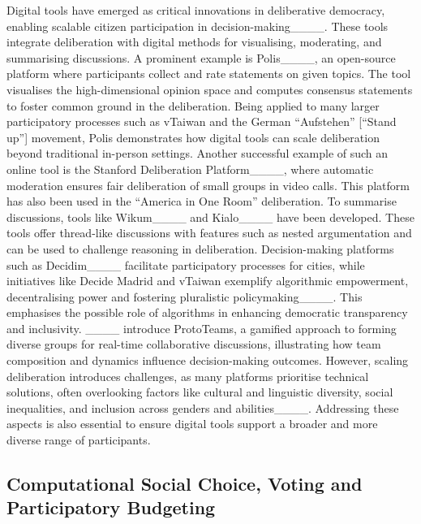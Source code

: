 Digital tools have emerged as critical innovations in deliberative democracy, enabling scalable citizen participation in decision-making____. These tools integrate deliberation with digital methods for visualising, moderating, and summarising discussions. A prominent example is Polis____, an open-source platform where participants collect and rate statements on given topics. The tool visualises the high-dimensional opinion space and computes consensus statements to foster common ground in the deliberation. Being applied to many larger participatory processes such as vTaiwan and the German \enquote{Aufstehen} [\enquote{Stand up}] movement, Polis demonstrates how digital tools can scale deliberation beyond traditional in-person settings. Another successful example of such an online tool is the Stanford Deliberation Platform____, where automatic moderation ensures fair deliberation of small groups in video calls. This platform has also been used in the \enquote{America in One Room} deliberation. To summarise discussions, tools like Wikum____ and Kialo____ have been developed.  These tools offer thread-like discussions with features such as nested argumentation and can be used to challenge reasoning in deliberation. Decision-making platforms such as Decidim____ facilitate participatory processes for cities, while initiatives like Decide Madrid and vTaiwan exemplify algorithmic empowerment, decentralising power and fostering pluralistic policymaking____. This emphasises the possible role of algorithms in enhancing democratic transparency and inclusivity. ____ introduce ProtoTeams, a gamified approach to forming diverse groups for real-time collaborative discussions, illustrating how team composition and dynamics influence decision-making outcomes. However, scaling deliberation introduces challenges, as many platforms prioritise technical solutions, often overlooking factors like cultural and linguistic diversity, social inequalities, and inclusion across genders and abilities____. Addressing these aspects is also essential to ensure digital tools support a broader and more diverse range of participants.

\subsection{Computational Social Choice, Voting and Participatory Budgeting}

